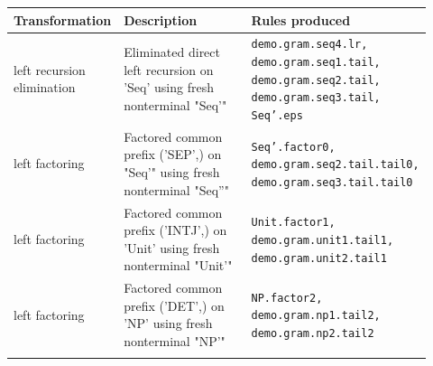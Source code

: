 \begin{longtable}{@{}p{0.20\linewidth}p{0.46\linewidth}p{0.26\linewidth}@{}}
\toprule
\textbf{Transformation} & \textbf{Description} & \textbf{Rules produced} \\
\midrule
\endhead
\bottomrule
\endfoot
left recursion elimination & Eliminated direct left recursion on 'Seq' using fresh nonterminal "Seq'" & \scriptsize\texttt{demo.gram.seq4.lr, demo.gram.seq1.tail, demo.gram.seq2.tail, demo.gram.seq3.tail, Seq'.eps} \\
\addlinespace
left factoring & Factored common prefix ('SEP',) on "Seq'" using fresh nonterminal "Seq''" & \scriptsize\texttt{Seq'.factor0, demo.gram.seq2.tail.tail0, demo.gram.seq3.tail.tail0} \\
\addlinespace
left factoring & Factored common prefix ('INTJ',) on 'Unit' using fresh nonterminal "Unit'" & \scriptsize\texttt{Unit.factor1, demo.gram.unit1.tail1, demo.gram.unit2.tail1} \\
\addlinespace
left factoring & Factored common prefix ('DET',) on 'NP' using fresh nonterminal "NP'" & \scriptsize\texttt{NP.factor2, demo.gram.np1.tail2, demo.gram.np2.tail2} \\
\addlinespace
\end{longtable}
